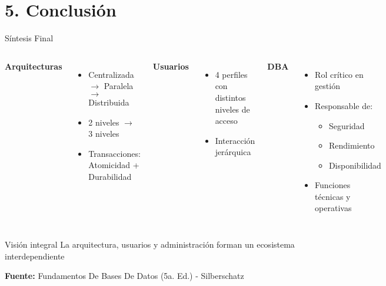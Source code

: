 \documentclass{beamer}
\begin{document}
\section{5. Conclusión}
\begin{frame}{Síntesis Final}
\begin{columns}[T]
\textbf{Arquitecturas}
\begin{itemize}
    \item Centralizada $\rightarrow$ Paralela $\rightarrow$ Distribuida
    \item 2 niveles $\rightarrow$ 3 niveles
    \item Transacciones: Atomicidad + Durabilidad
\end{itemize}

\textbf{Usuarios}
\begin{itemize}
    \item 4 perfiles con distintos niveles de acceso
    \item Interacción jerárquica
\end{itemize}

\textbf{DBA}
\begin{itemize}
    \item Rol crítico en gestión
    \item Responsable de:
    \begin{itemize}
        \item Seguridad
        \item Rendimiento
        \item Disponibilidad
    \end{itemize}
    \item Funciones técnicas y operativas
\end{itemize}
\end{columns}

\vspace{5mm}
\begin{block}{Visión integral}
La arquitectura, usuarios y administración forman un ecosistema interdependiente
\end{block}

\footnotesize\textbf{Fuente:} Fundamentos De Bases De Datos (5a. Ed.) - Silberschatz
\end{frame}
\end{document}

